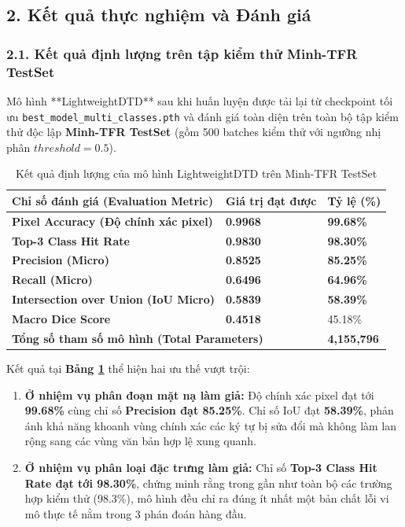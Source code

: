 \subsection{2. Kết quả thực nghiệm và Đánh giá}

\subsubsection{2.1. Kết quả định lượng trên tập kiểm thử Minh-TFR TestSet}
\indent\indent Mô hình **LightweightDTD** sau khi huấn luyện được tải lại từ checkpoint tối ưu \texttt{best\_model\_multi\_classes.pth} và đánh giá toàn diện trên toàn bộ tập kiểm thử độc lập \textbf{Minh-TFR TestSet} (gồm 500 batches kiểm thử với ngưỡng nhị phân $threshold = 0.5$).

\begin{table}[H]
    \centering
    \caption{Kết quả định lượng của mô hình LightweightDTD trên Minh-TFR TestSet}
    \label{tab:test_results}
    \vspace{0.2cm}
    \renewcommand{\arraystretch}{1.3}
    \begin{tabular}{|m{6.5cm}|m{4cm}|m{3.5cm}|}
        \hline
        \textbf{Chỉ số đánh giá (Evaluation Metric)} & \textbf{Giá trị đạt được} & \textbf{Tỷ lệ (\%)} \\
        \hline
        \textbf{Pixel Accuracy (Độ chính xác pixel)} & \textbf{0.9968} & \textbf{99.68\%} \\
        \hline
        \textbf{Top-3 Class Hit Rate} & \textbf{0.9830} & \textbf{98.30\%} \\
        \hline
        \textbf{Precision (Micro)} & \textbf{0.8525} & \textbf{85.25\%} \\
        \hline
        \textbf{Recall (Micro)} & \textbf{0.6496} & \textbf{64.96\%} \\
        \hline
        \textbf{Intersection over Union (IoU Micro)} & \textbf{0.5839} & \textbf{58.39\%} \\
        \hline
        \textbf{Macro Dice Score} & \textbf{0.4518} & 45.18\% \\
        \hline
        \multicolumn{2}{|l|}{\textbf{Tổng số tham số mô hình (Total Parameters)}} & \textbf{4,155,796} \\
        \hline
    \end{tabular}
\end{table}

Kết quả tại \textbf{Bảng \ref{tab:test_results}} thể hiện hai ưu thế vượt trội:
\begin{enumerate}
    \item \textbf{Ở nhiệm vụ phân đoạn mặt nạ làm giả:} Độ chính xác pixel đạt tới \textbf{99.68\%} cùng chỉ số \textbf{Precision đạt 85.25\%}. Chỉ số IoU đạt \textbf{58.39\%}, phản ánh khả năng khoanh vùng chính xác các ký tự bị sửa đổi mà không làm lan rộng sang các vùng văn bản hợp lệ xung quanh.
    \item \textbf{Ở nhiệm vụ phân loại đặc trưng làm giả:} Chỉ số \textbf{Top-3 Class Hit Rate đạt tới 98.30\%}, chứng minh rằng trong gần như toàn bộ các trường hợp kiểm thử (98.3\%), mô hình đều chỉ ra đúng ít nhất một bản chất lỗi vi mô thực tế nằm trong 3 phán đoán hàng đầu.
\end{enumerate}

